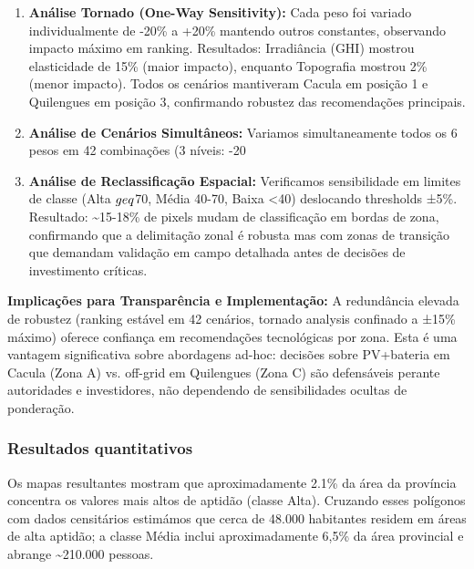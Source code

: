 \documentclass[12pt, a4paper]{article}
\begin{document}
\begin{enumerate}
  \item \textbf{Análise Tornado (One-Way Sensitivity):} Cada peso foi variado individualmente de -20\% a +20\% mantendo outros constantes, observando impacto máximo em ranking. Resultados: Irradiância (GHI) mostrou elasticidade de 15\% (maior impacto), enquanto Topografia mostrou 2\% (menor impacto). Todos os cenários mantiveram Cacula em posição 1 e Quilengues em posição 3, confirmando robustez das recomendações principais.

  \item \textbf{Análise de Cenários Simultâneos:} Variamos simultaneamente todos os 6 pesos em 42 combinações (3 níveis: -20%

  \item \textbf{Análise de Reclassificação Espacial:} Verificamos sensibilidade em limites de classe (Alta $\\geq$70, Média 40-70, Baixa <40) deslocando thresholds ±5\%. Resultado: \textasciitilde{}15-18\% de pixels mudam de classificação em bordas de zona, confirmando que a delimitação zonal é robusta mas com zonas de transição que demandam validação em campo detalhada antes de decisões de investimento críticas.
\end{enumerate}


\noindent \textbf{Implicações para Transparência e Implementação:} A redundância elevada de robustez (ranking estável em 42 cenários, tornado analysis confinado a ±15\% máximo) oferece confiança em recomendações tecnológicas por zona. Esta é uma vantagem significativa sobre abordagens ad-hoc: decisões sobre PV+bateria em Cacula (Zona A) vs. off-grid em Quilengues (Zona C) são defensáveis perante autoridades e investidores, não dependendo de sensibilidades ocultas de ponderação.

\subsubsection{Resultados quantitativos}

Os mapas resultantes mostram que aproximadamente 2.1\% da área da província concentra os valores mais altos de aptidão (classe Alta). Cruzando esses polígonos com dados censitários estimámos que cerca de 48.000 habitantes residem em áreas de alta aptidão; a classe Média inclui aproximadamente 6,5\% da área provincial e abrange \textasciitilde{}210.000 pessoas.
\end{document}
